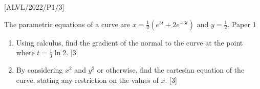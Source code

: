 \item {[}ALVL/2022/P1/3{]}

The parametric equations of a curve are $x=\frac{1}{2}\left(e^{3t}+2e^{-3t}\right)$
and $y=\frac{1}{2}%
$. Paper 1
\begin{enumerate}
\item Using calculus, find the gradient of the normal to the curve at the
point where $t=\frac{1}{3}\ln2$. \hfill{}{[}3{]}
\item By considering $x^{2}$ and $y^{2}$ or otherwise, find the cartesian
equation of the curve, stating any restriction on the values of $x$.\hfill{}
{[}3{]}
\end{enumerate}

